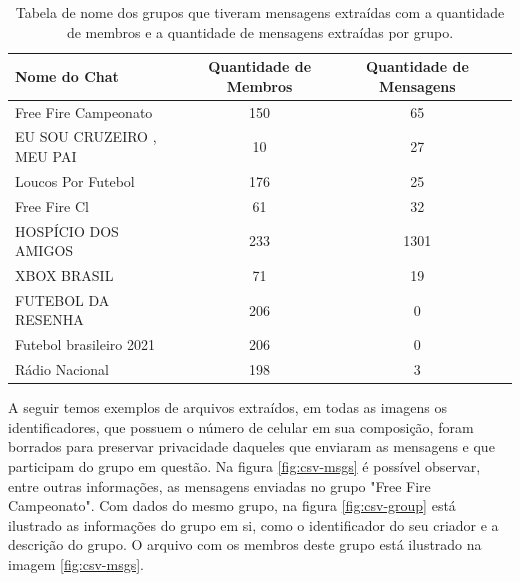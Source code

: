 

\begin{table}[!htb]
  \centering
  \caption{Tabela de nome dos grupos que tiveram mensagens extraídas com a quantidade de membros e a quantidade de mensagens extraídas por grupo.}
    \label{fig:result}
  \begin{tabular}{l c c c}
  \toprule
    Nome do Chat & Quantidade de Membros & Quantidade de Mensagens \\
    \midrule
        Free Fire Campeonato & 150 & 65  \\
        
        EU SOU CRUZEIRO , MEU PAI & 10 & 27  \\
        
        Loucos Por Futebol & 176 & 25  \\
        
        Free Fire Cl & 61 & 32  \\
        
        HOSPÍCIO DOS AMIGOS & 233 & 1301  \\
        
        XBOX BRASIL & 71 & 19  \\
        
        FUTEBOL DA RESENHA & 206 & 0  \\
        
        Futebol brasileiro 2021 & 206 & 0  \\
        
        Rádio Nacional & 198 & 3  \\
    \bottomrule
  \end{tabular}
\end{table}

A seguir temos exemplos de arquivos extraídos, em todas as imagens os identificadores, que possuem o número de celular em sua composição, foram borrados para preservar privacidade daqueles que enviaram as mensagens e que participam do grupo em questão. Na figura \ref{fig:csv-msgs} é possível observar, entre outras informações, as mensagens enviadas no grupo "Free Fire Campeonato". Com dados do mesmo grupo, na figura \ref{fig:csv-group} está ilustrado as informações do grupo em si, como o identificador do seu criador e a descrição do grupo. O arquivo com os membros deste grupo está ilustrado na imagem \ref{fig:csv-msgs}. 

